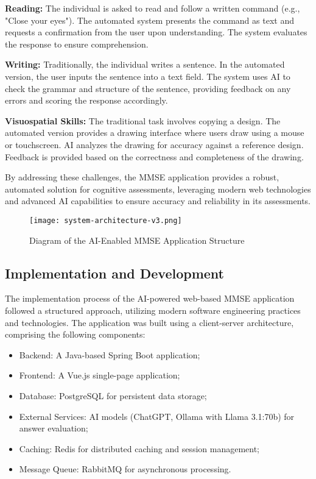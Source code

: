 \textbf{Reading:} The individual is asked to read and follow a written command (e.g., "Close your eyes"). The automated system presents the command as text and requests a confirmation from the user upon understanding. The system evaluates the response to ensure comprehension.

\textbf{Writing:} Traditionally, the individual writes a sentence. In the automated version, the user inputs the sentence into a text field. The system uses AI to check the grammar and structure of the sentence, providing feedback on any errors and scoring the response accordingly.

\textbf{Visuospatial Skills:} The traditional task involves copying a design. The automated version provides a drawing interface where users draw using a mouse or touchscreen. AI analyzes the drawing for accuracy against a reference design. Feedback is provided based on the correctness and completeness of the drawing.

By addressing these challenges, the MMSE application provides a robust, automated solution for cognitive assessments, leveraging modern web technologies and advanced AI capabilities to ensure accuracy and reliability in its assessments.

\begin{figure}[h!]
\begin{center}
\texttt{[image: system-architecture-v3.png]}
\caption{Diagram of the AI-Enabled MMSE Application Structure}
\label{fig:system-architecture}
\end{center}
\end{figure}

\subsection{Implementation and Development}

The implementation process of the AI-powered web-based MMSE application followed a structured approach, utilizing modern software engineering practices and technologies. The application was built using a client-server architecture, comprising the following components:
\begin{itemize}
    \item Backend: A Java-based Spring Boot application;
    \item Frontend: A Vue.js single-page application;
    \item Database: PostgreSQL for persistent data storage;
    \item External Services: AI models (ChatGPT, Ollama with Llama 3.1:70b) for answer evaluation;
    \item Caching: Redis for distributed caching and session management;
    \item Message Queue: RabbitMQ for asynchronous processing.
\end{itemize}


